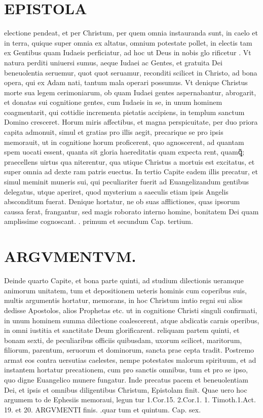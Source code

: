 \documentclass{article}
\begin{document}
\begin{pages}
\section*{EPISTOLA }\pstart electione pendeat, et per Christum, per quem omnia instauranda sunt, in caelo et in terra, quique super omnia ex altatus, omnium potestate pollet, in electis tam ex Gentibus quam Iudaeis perficiatur, ad hoc ut Deus in nobis glo rificetur .  Vt natura perditi uniuersi sumus, aeque Iudaei ac Gentes, et gratuita Dei beneuolentia seruemur, quot quot seruamur, reconditi scilicet in Christo, ad bona opera, qui ex Adam nati, tantum mala operari possumus.  Vt denique Christus morte sua legem cerimoniarum, ob quam Iudaei gentes aspernabantur, abrogarit, et donatas sui cognitione gentes, cum Iudaeis in se, in unum hominem coagmentarit, qui cottidie incrementa pietatis accipiens, in templum sanctum Domino cresceret.   \pend\pstart Horum miris affectibus, et magna perspicuitate, per duo priora capita admonuit, simul et gratias pro illis aegit, precarique se pro ipsis memorauit, ut in cognitione horum proficerent, quo agnoscerent, ad quantam spem uocati essent, quanta sit gloria haereditatis quam expecta rent, quamꝗ̃; praecellens uirtus qua niterentur, qua utique Christus a mortuis est excitatus, et super omnia ad dexte ram patris euectus.  In tertio Capite eadem illis precatur, et simul meminit muneris sui, qui peculiariter fuerit ad Euangelizandum gentibus delegatus, utque aperiret, quod mysterium a saeculis etiam ipsis Angelis absconditum fuerat.  Denique hortatur, ne ob suas afflictiones, quas ipsorum caussa ferat, frangantur, sed magis roborato interno homine, bonitatem Dei quam amplissime cognoscant.   \pendCap. primum et secundum Cap.  tertium.  
\section*{ARGVMENTVM.  }\pstart Deinde quarto Capite, et bona parte quinti, ad studium dilectionis ueramque animorum unitatem, tum et depositionem ueteris hominis cum coperibus suis, multis argumentis hortatur, memorans, in hoc Christum imtio regni sui alios dedisse Apostolos, alios Prophetas etc. ut in cognitione Christi singuli confirmati, in unum hominem summa dilectione coalescerent, atque abdicatis carnis operibus, in omni iustitia et sanctitate Deum glorificarent. reliquam partem quinti, et bonam sexti, de peculiaribus officiis quibusdam, uxorum scilicet, maritorum, filiorum, parentum, seruorum et dominorum, sancta prae cepta tradit.  Postremo armat eos contra uersutias caelestes, nempe potestates malorum spirituum, et ad instantem hortatur precationem, cum pro sanctis omnibus, tum et pro se ipso, quo digne Euangelico munere fungatur.  Inde precatus pacem et beneuolentiam Dei, et ipsis et omnibus diligentibus Christum, Epistolam finit. Quae uero hoc argumem to de Ephesiis memoraui, legun tur 1.Cor.15. 2.Cor.1. 1. Timoth.1.Act. 19. et 20. ARGVMENTI finis.   \pendCap.quar tum et quintum. Cap.  sex.  

\end{pages}
\end{document}
